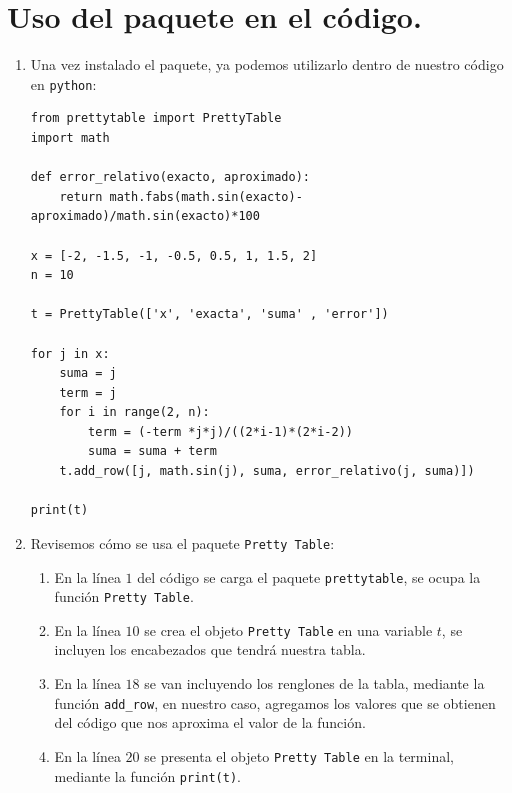 \documentclass[11pt]{article}
\newcommand{\letraconsola}[1]{\texttt{#1}}
\begin{document}
\section{Uso del paquete en el código.}
\begin{enumerate}
\item Una vez instalado el paquete, ya podemos utilizarlo dentro de nuestro código en \letraconsola{python}:
\begin{lstlisting}[style=codigopython]
from prettytable import PrettyTable
import math

def error_relativo(exacto, aproximado):
    return math.fabs(math.sin(exacto)- aproximado)/math.sin(exacto)*100

x = [-2, -1.5, -1, -0.5, 0.5, 1, 1.5, 2]
n = 10

t = PrettyTable(['x', 'exacta', 'suma' , 'error'])

for j in x:
    suma = j
    term = j
    for i in range(2, n):
        term = (-term *j*j)/((2*i-1)*(2*i-2))
        suma = suma + term
    t.add_row([j, math.sin(j), suma, error_relativo(j, suma)])

print(t)
\end{lstlisting}
\item Revisemos cómo se usa el paquete \letraconsola{Pretty Table}:
\begin{enumerate}
\item En la línea $1$ del código se carga el paquete \letraconsola{prettytable}, se ocupa la función \letraconsola{Pretty Table}.
\item En la línea $10$ se crea el objeto \letraconsola{Pretty Table} en una variable $t$, se incluyen los encabezados que tendrá nuestra tabla.
\item En la línea $18$ se van incluyendo los renglones de la tabla, mediante la función \letraconsola{add\_row}, en nuestro caso, agregamos los valores que se obtienen del código que nos aproxima el valor de la función.
\item En la línea $20$ se presenta el objeto \letraconsola{Pretty Table} en la terminal, mediante la función \verb|print(t)|.
\end{enumerate}
\end{enumerate}
\end{document}
